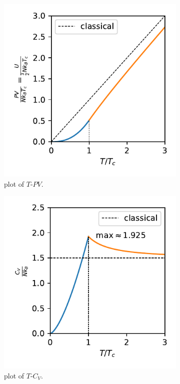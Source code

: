 \begin{itemize}
	\begin{figure}[H]
		\centering
		\begin{subfigure}{0.4\linewidth}
			\centering
			\includegraphics[scale=0.8]{figures/plot of T-PV.pdf}
			\caption{plot of $T$-$P V$.}
		\end{subfigure}
		\begin{subfigure}{0.4\linewidth}
			\centering
			\includegraphics[scale=0.8]{figures/plot of T-C_V.pdf}
			\caption{plot of $T$-$C_V$.}
		\end{subfigure}
		\caption{}
	\end{figure}
	

\end{itemize}
